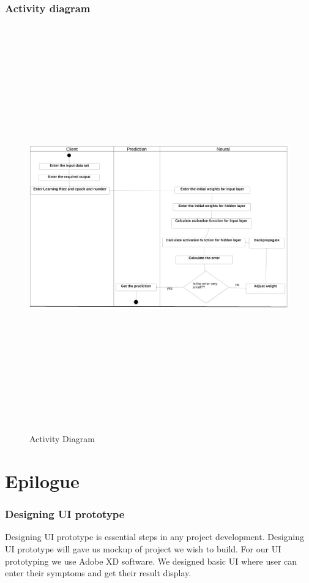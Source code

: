 \subsection{Activity diagram}
\begin{figure}[H]
\begin{center}
    
\includegraphics[width=160mm,height=175mm]{images/activity.png}
 \caption{Activity Diagram}
 \end{center}                
\end{figure}


\chapter{Epilogue}

\subsection{Designing UI prototype}
Designing UI prototype is essential steps in any project development. Designing UI prototype will gave us mockup of project we wish to build. For our UI prototyping we use Adobe XD software. We designed basic UI where user can enter their symptoms and get their result display.


